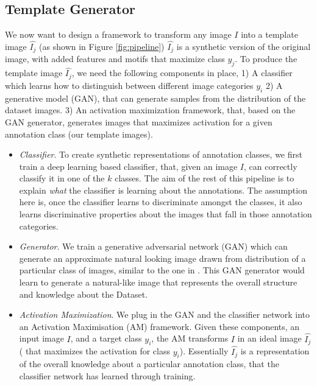 \subsection{Template Generator}
\par 
We now want to design a framework to transform any image $I$ into a template image $\hat{I_j}$ (as shown in Figure \ref{fig:pipeline}) %
$\hat{I_j}$  is  a synthetic version of the original image, with added features and motifs that maximize class $y_j$. %
To produce the template image $\hat{I_j}$, we need the following components in place, 1) A classifier which learns how to distinguish between different image categories $y_i$ 2)  A generative model (GAN), that can generate samples from the distribution of the dataset images. 3) An activation maximization framework, that, based on the GAN generator, generates images that maximizes activation for a given annotation class \cite{dosovitskiy2016inverting} (our template images). 
\begin{itemize}
	\item{\textit{Classifier}}. %
	To create synthetic representations of annotation classes, we first train a deep learning based classifier, that, given an image $I$, can correctly classify it in one of the $k$ classes. The aim of the rest of this pipeline is to explain \textit{what} the classifier is learning about the annotations. The assumption here is, once the classifier learns to discriminate amongst the classes, it also learns discriminative properties about the images that fall in those annotation categories. %
	\item \textit{Generator}. We train a generative adversarial network (GAN) which can generate an approximate natural looking image drawn from distribution of a particular class of images, similar to the one  in \cite{dosovitskiy2016inverting}. This GAN generator would learn to generate a natural-like image that represents the overall structure and knowledge about the Dataset.
	\item \textit{Activation Maximization}. We plug in the GAN and the classifier network into an Activation Maximisation (AM) framework. Given these components, an input image $I$, and a target class $y_i$, the AM transforms $I$ in an ideal image $\hat{I_j}$ ( that maximizes the activation for  class $y_i$). %
	Essentially $\hat{I_j}$  is a representation of the overall knowledge about a particular annotation class, that the classifier network has learned through training. 
\end{itemize}	


